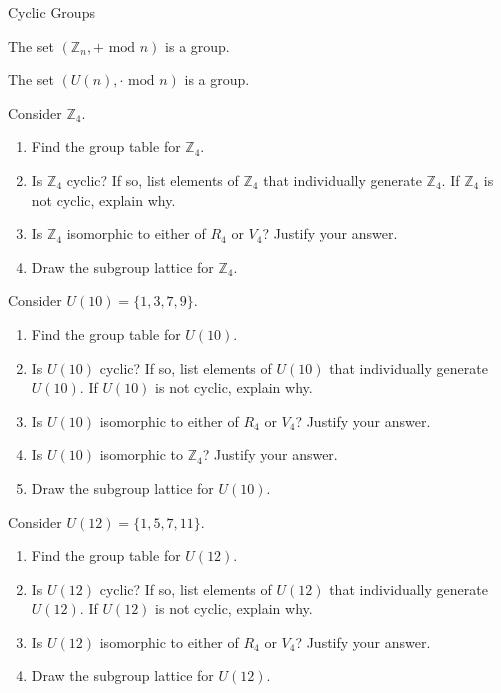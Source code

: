 \begin{section}{Cyclic Groups}
\begin{theorem}
The set $(\mathbb{Z}_n,+\text{ mod }n)$ is a group.  
\end{theorem}

\begin{theorem}
The set $(U(n),\cdot\text{ mod }n)$ is a group.  
\end{theorem}

\begin{exercise}
Consider $\mathbb{Z}_4$.
\begin{enumerate}[label=\rm{(\alph*)}]
\item Find the group table for $\mathbb{Z}_4$.
\item Is $\mathbb{Z}_4$ cyclic? If so, list elements of $\mathbb{Z}_4$ that individually generate $\mathbb{Z}_4$.  If $\mathbb{Z}_4$ is not cyclic, explain why.
\item Is $\mathbb{Z}_4$ isomorphic to either of $R_4$ or $V_4$? Justify your answer.
\item Draw the subgroup lattice for $\mathbb{Z}_4$.
\end{enumerate}
\end{exercise}

\begin{exercise}\label{exer:U10}
Consider $U(10)=\{1,3,7,9\}$.
\begin{enumerate}[label=\rm{(\alph*)}]
\item Find the group table for $U(10)$.
\item Is $U(10)$ cyclic? If so, list elements of $U(10)$ that individually generate $U(10)$.  If $U(10)$ is not cyclic, explain why.
\item Is $U(10)$ isomorphic to either of $R_4$ or $V_4$? Justify your answer.
\item Is $U(10)$ isomorphic to $\mathbb{Z}_4$? Justify your answer.
\item Draw the subgroup lattice for $U(10)$.
\end{enumerate}
\end{exercise}

\begin{exercise}\label{exer:U12}
Consider $U(12)=\{1,5,7,11\}$.
\begin{enumerate}[label=\rm{(\alph*)}]
\item Find the group table for $U(12)$.
\item Is $U(12)$ cyclic? If so, list elements of $U(12)$ that individually generate $U(12)$.  If $U(12)$ is not cyclic, explain why.
\item Is $U(12)$ isomorphic to either of $R_4$ or $V_4$? Justify your answer.
\item Draw the subgroup lattice for $U(12)$.
\end{enumerate}
\end{exercise}


\end{section}
